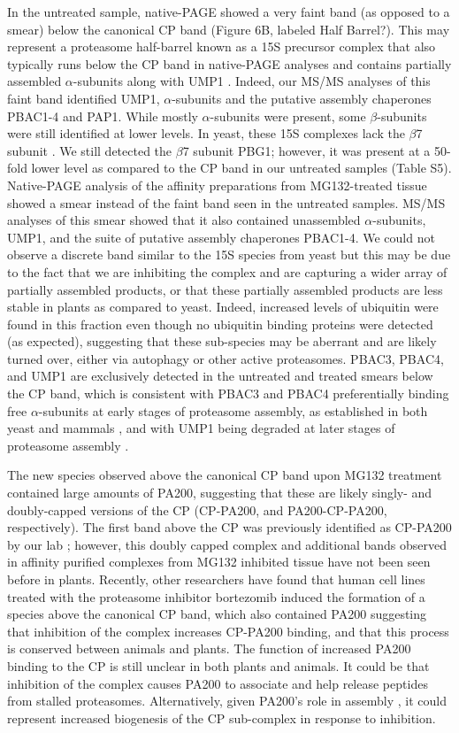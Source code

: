 In the untreated sample, native-PAGE showed a very faint band (as opposed to a smear) below the canonical CP band (Figure 6B, labeled Half Barrel?). This may represent a proteasome half-barrel known as a 15S precursor complex that also typically runs below the CP band in native-PAGE analyses and contains partially assembled $\alpha$-subunits along with UMP1 \citep{kock15}. Indeed, our MS/MS analyses of this faint band identified UMP1, $\alpha$-subunits and the putative assembly chaperones PBAC1-4 and PAP1. While mostly $\alpha$-subunits were present, some $\beta$-subunits were still identified at lower levels. In yeast, these 15S complexes lack the $\beta$7 subunit \citep{kock15}. We still detected the $\beta$7 subunit PBG1; however, it was present at a 50-fold lower level as compared to the CP band in our untreated samples (Table S5). Native-PAGE analysis of the affinity preparations from MG132-treated tissue showed a smear instead of the faint band seen in the untreated samples. MS/MS analyses of this smear showed that it also contained unassembled $\alpha$-subunits, UMP1, and the suite of putative assembly chaperones PBAC1-4. We could not observe a discrete band similar to the 15S species from yeast but this may be due to the fact that we are inhibiting the complex and are capturing a wider array of partially assembled products, or that these partially assembled products are less stable in plants as compared to yeast. Indeed, increased levels of ubiquitin were found in this fraction even though no ubiquitin binding proteins were detected (as expected), suggesting that these sub-species may be aberrant and are likely turned over, either via autophagy or other active proteasomes. PBAC3, PBAC4, and UMP1 are exclusively detected in the untreated and treated smears below the CP band, which is consistent with PBAC3 and PBAC4 preferentially binding free $\alpha$-subunits at early stages of proteasome assembly, as established in both yeast and mammals \citep{kunjappu14}, and with UMP1 being degraded at later stages of proteasome assembly \citep{ramos98}.

	The new species observed above the canonical CP band upon MG132 treatment contained large amounts of PA200, suggesting that these are likely singly- and doubly-capped versions of the CP (CP-PA200, and PA200-CP-PA200, respectively). The first band above the CP was previously identified as CP-PA200 by our lab \citep{book10}; however, this doubly capped complex and additional bands observed in affinity purified complexes from MG132 inhibited tissue have not been seen before in plants. Recently, other researchers have found that human cell lines treated with the proteasome inhibitor bortezomib induced the formation of a species above the canonical CP band, which also contained PA200 \citep{welk16} suggesting that inhibition of the complex increases CP-PA200 binding, and that this process is conserved between animals and plants. The function of increased PA200 binding to the CP is still unclear in both plants and animals. It could be that inhibition of the complex causes PA200 to associate and help release peptides from stalled proteasomes. Alternatively, given PA200’s role in assembly \citep{savulescu11}, it could represent increased biogenesis of the CP sub-complex in response to inhibition.
	
